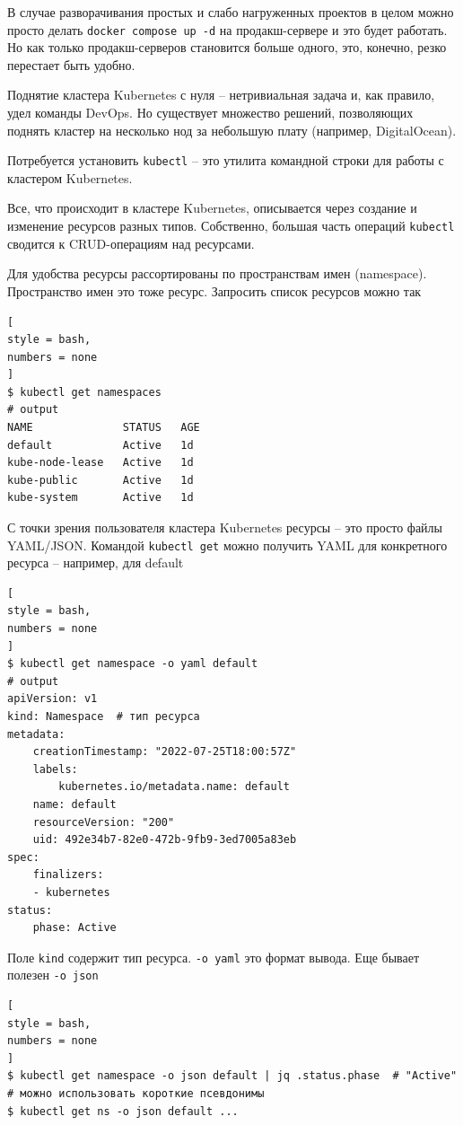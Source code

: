 \documentclass[%
	11pt,
	a4paper,
	utf8,
		]{article}
\begin{document}
В случае разворачивания простых и слабо нагруженных проектов в целом можно просто делать \verb|docker compose up -d| на продакш-сервере и это будет работать. Но как только продакш-серверов становится больше одного, это, конечно, резко перестает быть удобно.

Поднятие кластера Kubernetes с нуля -- нетривиальная задача и, как правило, удел команды DevOps. Но существует множество решений, позволяющих поднять кластер на несколько нод за небольшую плату (например, DigitalOcean). 

Потребуется установить \verb*|kubectl| -- это утилита командной строки для работы с кластером Kubernetes.

Все, что происходит в кластере Kubernetes, описывается через создание и изменение ресурсов разных типов. Собственно, большая часть операций \verb*|kubectl| сводится к CRUD-операциям над ресурсами.

Для удобства ресурсы рассортированы по пространствам имен (namespace). Пространство имен это тоже ресурс. Запросить список ресурсов можно так
\begin{lstlisting}[
style = bash,
numbers = none
]
$ kubectl get namespaces
# output
NAME              STATUS   AGE
default           Active   1d
kube-node-lease   Active   1d
kube-public       Active   1d
kube-system       Active   1d
\end{lstlisting}

С точки зрения пользователя кластера Kubernetes ресурсы -- это просто файлы YAML/JSON. Командой \verb|kubectl get| можно получить YAML для конкретного ресурса -- например, для default
\begin{lstlisting}[
style = bash,
numbers = none
]
$ kubectl get namespace -o yaml default
# output
apiVersion: v1
kind: Namespace  # тип ресурса
metadata:
	creationTimestamp: "2022-07-25T18:00:57Z"
	labels:
		kubernetes.io/metadata.name: default
	name: default
	resourceVersion: "200"
	uid: 492e34b7-82e0-472b-9fb9-3ed7005a83eb
spec:
	finalizers:
	- kubernetes
status:
	phase: Active
\end{lstlisting}

Поле \verb*|kind| содержит тип ресурса. \verb|-o yaml| это формат вывода. Еще бывает полезен \verb|-o json|
\begin{lstlisting}[
style = bash,
numbers = none
]
$ kubectl get namespace -o json default | jq .status.phase  # "Active"
# можно использовать короткие псевдонимы
$ kubectl get ns -o json default ...
\end{lstlisting}
\end{document}
